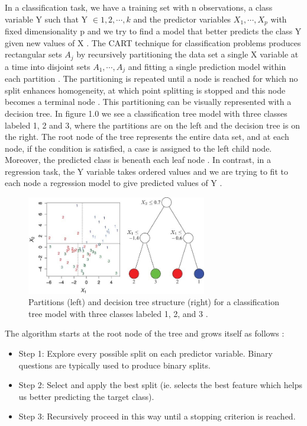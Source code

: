\documentclass{usiinftr}
\begin{document}
In a classification task, we have a training set with n observations, a class variable Y such that Y $\in {1, 2, \cdots, k}$ and the predictor variables $X_1, \cdots ,X_p$ with fixed dimensionality p and we try to find a model that better predicts the class Y given new values of X \cite{1}. The CART technique for classification problems produces rectangular sets $A_j$ by recursively partitioning the data set a single X variable at a time into disjoint sets $A_1,\cdots, A_j$ and fitting a single prediction model within each partition \cite{2}. The partitioning is repeated until a node is reached for which no split enhances homogeneity, at which point splitting is stopped and this node becomes a terminal node \cite{1}. This partitioning can be visually represented with a decision tree. In figure 1.0 we see a classification tree model with three classes labeled 1, 2 and 3, where the partitions are on the left and the decision tree is on the right. The root node of the tree represents the entire data set, and at each node, if the condition is satisfied, a case is assigned to the left child node. Moreover, the predicted class is beneath each leaf node \cite{2}. In contrast, in a regression task, the Y variable takes ordered values and we are trying to fit to each node a regression model to give predicted values of Y \cite{2}.

\begin{figure}[h!] 
\centering
\includegraphics[width=0.7\textwidth]{images/image114.png}
\caption{Partitions (left) and decision tree structure (right) for a classification tree model with three classes labeled 1, 2, and 3 \cite{2}.}
\label{VarImp}
\end{figure}

The algorithm starts at the root node of the tree and grows itself as follows \cite{3}: 
\begin{itemize}
\item Step 1: Explore every possible split on each predictor variable. Binary questions are typically used to produce binary splits.
\item Step 2: Select and apply the best split (ie. selects the best feature which helps us better predicting the target class).
\item Step 3: Recursively proceed in this way until a stopping criterion is reached. 
\end{itemize}
\end{document}
